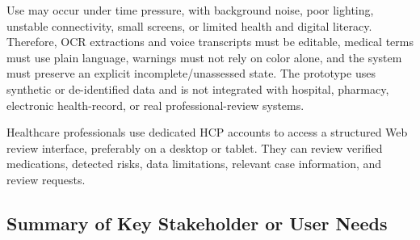 Use may occur under time pressure, with background noise, poor lighting,
unstable connectivity, small screens, or limited health and digital literacy.
Therefore, OCR extractions and voice transcripts must be editable, medical
terms must use plain language, warnings must not rely on color alone, and the
system must preserve an explicit incomplete/unassessed state. The prototype
uses synthetic or de-identified data and is not integrated with hospital,
pharmacy, electronic health-record, or real professional-review systems.

Healthcare professionals use dedicated HCP accounts
to access a structured Web review interface,
preferably on a desktop or tablet. They can review
verified medications, detected risks, data limitations,
relevant case information, and review requests.


\subsection{Summary of Key Stakeholder or User Needs}

